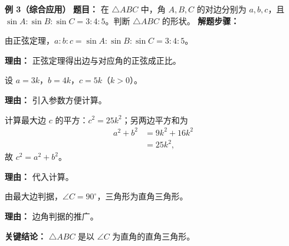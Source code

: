 \begin{examplebox}
	\medskip
	\textbf{\textcolor{CExample}{例 3（综合应用）}}
	\textbf{\textcolor{CExample}{题目：}}
	在 $\triangle ABC$ 中，角 $A,B,C$ 的对边分别为 $a,b,c$，且 $\sin A:\sin B:\sin C=3:4:5$。判断 $\triangle ABC$ 的形状。
	\textbf{\textcolor{CExample}{解题步骤：}}
	\begin{description}[style=nextline, leftmargin=2.8em, labelsep=0.5em, itemsep=0.45em]
		\item[\textbf{第一步（边角转化）：}]
			由正弦定理，$a:b:c=\sin A:\sin B:\sin C=3:4:5$。
			\par\textbf{理由：} 正弦定理得出边与对应角的正弦成正比。
		\item[\textbf{第二步（设比例系数）：}]
			设 $a=3k$，$b=4k$，$c=5k$（$k>0$）。
			\par\textbf{理由：} 引入参数方便计算。
		\item[\textbf{第三步（平方比较）：}]
			计算最大边 $c$ 的平方：$c^2=25k^2$；另两边平方和为
			\[
				\begin{aligned}
					a^2+b^2 &= 9k^2+16k^2 \\ &= 25k^2,
			\end{aligned}
			\]
			故 $c^2=a^2+b^2$。
			\par\textbf{理由：} 代入计算。
		\item[\textbf{第四步（应用推广结论）：}]
			由最大边判据，$\angle C=90^\circ$，三角形为直角三角形。
			\par\textbf{理由：} 边角判据的推广。
	\end{description}
	\textbf{\textcolor{CExample}{关键结论：}}
	$\triangle ABC$ 是以 $\angle C$ 为直角的直角三角形。
\end{examplebox}
